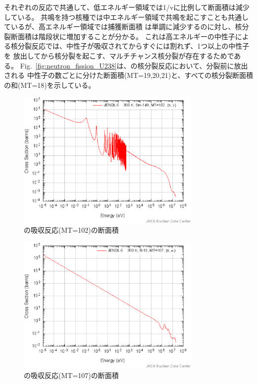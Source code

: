それぞれの反応で共通して、低エネルギー領域では1/vに比例して断面積は減少している。
共鳴を持つ核種では中エネルギー領域で共鳴を起こすことも共通しているが、高エネルギー領域では捕獲断面積
は単調に減少するのに対し、核分裂断面積は階段状に増加することが分かる。
これは高エネルギーの中性子による核分裂反応では、中性子が吸収されてからすぐには割れず、1つ以上の中性子を
放出してから核分裂を起こす、マルチチャンス核分裂が存在するためである。
Fig.~\ref{fig:neutron_fission_U238}は、の核分裂反応において、分裂前に放出される
中性子の数ごとに分けた断面積(MT=19,20,21)と、すべての核分裂断面積の和(MT=18)を示している。

\begin{figure}[htbp]
  \centering
  \includegraphics[width=0.8\textwidth]{figure/SmMT102.eps}
  \caption{の吸収反応(MT=102)の断面積}
  \label{fig:neutron_absorption_Sm149}
\end{figure}

\begin{figure}[htbp]
  \centering
  \includegraphics[width=0.8\textwidth]{figure/B10MT107.eps}
  \caption{の吸収反応(MT=107)の断面積}
  \label{fig:neutron_capture_B10}
\end{figure}

